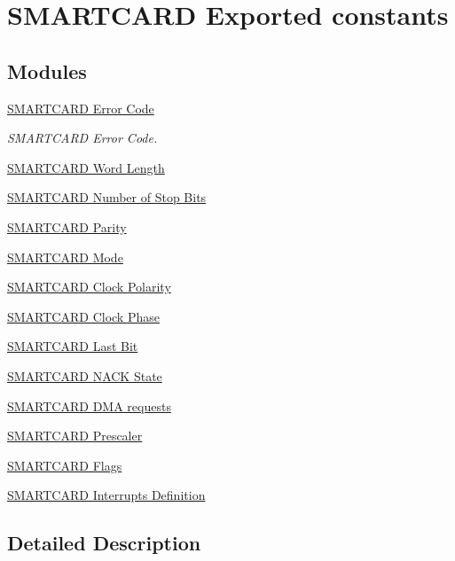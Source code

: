 \hypertarget{group___s_m_a_r_t_c_a_r_d___exported___constants}{}\section{S\+M\+A\+R\+T\+C\+A\+RD Exported constants}
\label{group___s_m_a_r_t_c_a_r_d___exported___constants}
\subsection*{Modules}
\begin{DoxyCompactItemize}
\item 
\hyperlink{group___s_m_a_r_t_c_a_r_d___error___code}{S\+M\+A\+R\+T\+C\+A\+R\+D Error Code}
\begin{DoxyCompactList}\small\item\em S\+M\+A\+R\+T\+C\+A\+RD Error Code. \end{DoxyCompactList}\item 
\hyperlink{group___s_m_a_r_t_c_a_r_d___word___length}{S\+M\+A\+R\+T\+C\+A\+R\+D Word Length}
\item 
\hyperlink{group___s_m_a_r_t_c_a_r_d___stop___bits}{S\+M\+A\+R\+T\+C\+A\+R\+D Number of Stop Bits}
\item 
\hyperlink{group___s_m_a_r_t_c_a_r_d___parity}{S\+M\+A\+R\+T\+C\+A\+R\+D Parity}
\item 
\hyperlink{group___s_m_a_r_t_c_a_r_d___mode}{S\+M\+A\+R\+T\+C\+A\+R\+D Mode}
\item 
\hyperlink{group___s_m_a_r_t_c_a_r_d___clock___polarity}{S\+M\+A\+R\+T\+C\+A\+R\+D Clock Polarity}
\item 
\hyperlink{group___s_m_a_r_t_c_a_r_d___clock___phase}{S\+M\+A\+R\+T\+C\+A\+R\+D Clock Phase}
\item 
\hyperlink{group___s_m_a_r_t_c_a_r_d___last___bit}{S\+M\+A\+R\+T\+C\+A\+R\+D Last Bit}
\item 
\hyperlink{group___smart_card___n_a_c_k___state}{S\+M\+A\+R\+T\+C\+A\+R\+D N\+A\+C\+K State}
\item 
\hyperlink{group___smart_card___d_m_a___requests}{S\+M\+A\+R\+T\+C\+A\+R\+D D\+M\+A requests}
\item 
\hyperlink{group___s_m_a_r_t_c_a_r_d___prescaler}{S\+M\+A\+R\+T\+C\+A\+R\+D Prescaler}
\item 
\hyperlink{group___smart_card___flags}{S\+M\+A\+R\+T\+C\+A\+R\+D Flags}
\item 
\hyperlink{group___smart_card___interrupt__definition}{S\+M\+A\+R\+T\+C\+A\+R\+D Interrupts Definition}
\end{DoxyCompactItemize}


\subsection{Detailed Description}
